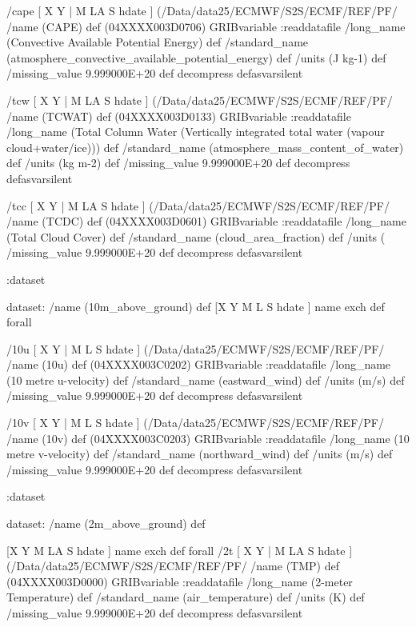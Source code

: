 \begin{ingrid}
{%
/cape { [ X Y | M LA S hdate ] (/Data/data25/ECMWF/S2S/ECMF/REF/PF/%
/name (CAPE) def
(04XXXX003D0706) GRIBvariable
:readdatafile
/long_name (Convective Available Potential Energy) def
/standard_name (atmosphere_convective_available_potential_energy) def
/units (J kg-1) def
/missing_value 9.999000E+20 def
decompress
} defasvarsilent

/tcw { [ X Y | M LA S hdate ] (/Data/data25/ECMWF/S2S/ECMF/REF/PF/%
/name (TCWAT) def
(04XXXX003D0133) GRIBvariable
:readdatafile
/long_name (Total Column Water (Vertically integrated total water (vapour cloud+water/ice))) def
/standard_name (atmosphere_mass_content_of_water) def
/units (kg m-2) def
/missing_value 9.999000E+20 def
decompress
} defasvarsilent

/tcc { [ X Y | M LA S hdate ] (/Data/data25/ECMWF/S2S/ECMF/REF/PF/%
/name (TCDC) def
(04XXXX003D0601) GRIBvariable
:readdatafile
/long_name (Total Cloud Cover) def
/standard_name (cloud_area_fraction) def
/units (%
/missing_value 9.999000E+20 def
decompress
} defasvarsilent

:dataset

dataset:
/name (10m_above_ground) def
[X Y M L S hdate ] {name exch def } forall

/10u { [ X Y | M L S hdate ] (/Data/data25/ECMWF/S2S/ECMF/REF/PF/%
/name (10u) def
(04XXXX003C0202) GRIBvariable
:readdatafile
/long_name (10 metre u-velocity) def
/standard_name (eastward_wind) def
/units (m/s) def
/missing_value 9.999000E+20 def
decompress
} defasvarsilent

/10v { [ X Y | M L S hdate ] (/Data/data25/ECMWF/S2S/ECMF/REF/PF/%
/name (10v) def
(04XXXX003C0203) GRIBvariable
:readdatafile
/long_name (10 metre v-velocity) def
/standard_name (northward_wind) def
/units (m/s) def
/missing_value 9.999000E+20 def
decompress
} defasvarsilent

:dataset

dataset:
/name (2m_above_ground) def

[X Y M LA S hdate ] {name exch def } forall
/2t { [ X Y | M LA S hdate ] (/Data/data25/ECMWF/S2S/ECMF/REF/PF/%
/name (TMP) def
(04XXXX003D0000) GRIBvariable
:readdatafile
/long_name (2-meter Temperature) def
/standard_name (air_temperature) def
/units (K) def
/missing_value 9.999000E+20 def
decompress
} defasvarsilent

}
\end{ingrid}
